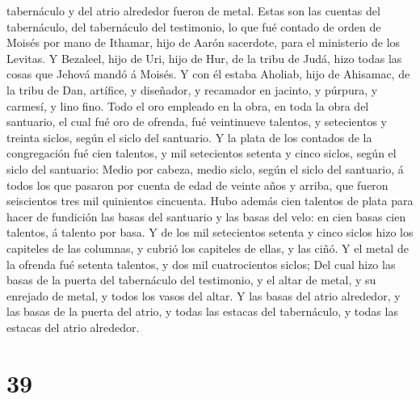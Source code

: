 tabernáculo y del atrio alrededor fueron de metal.  Estas
son las cuentas del tabernáculo, del tabernáculo del testimonio, lo que
fué contado de orden de Moisés por mano de Ithamar, hijo de Aarón
sacerdote, para el ministerio de los Levitas.  Y Bezaleel,
hijo de Uri, hijo de Hur, de la tribu de Judá, hizo todas las cosas que
Jehová mandó á Moisés.  Y con él estaba Aholiab, hijo de
Ahisamac, de la tribu de Dan, artífice, y diseñador, y recamador en
jacinto, y púrpura, y carmesí, y lino fino.  Todo el oro
empleado en la obra, en toda la obra del santuario, el cual fué oro de
ofrenda, fué veintinueve talentos, y setecientos y treinta siclos, según
el siclo del santuario.  Y la plata de los contados de la
congregación fué cien talentos, y mil setecientos setenta y cinco
siclos, según el siclo del santuario:  Medio por cabeza,
medio siclo, según el siclo del santuario, á todos los que pasaron por
cuenta de edad de veinte años y arriba, que fueron seiscientos tres mil
quinientos cincuenta.  Hubo además cien talentos de plata
para hacer de fundición las basas del santuario y las basas del velo: en
cien basas cien talentos, á talento por basa.  Y de los mil
setecientos setenta y cinco siclos hizo los capiteles de las columnas, y
cubrió los capiteles de ellas, y las ciñó.  Y el metal de
la ofrenda fué setenta talentos, y dos mil cuatrocientos siclos;
 Del cual hizo las basas de la puerta del tabernáculo del
testimonio, y el altar de metal, y su enrejado de metal, y todos los
vasos del altar.  Y las basas del atrio alrededor, y las
basas de la puerta del atrio, y todas las estacas del tabernáculo, y
todas las estacas del atrio alrededor.

\hypertarget{section-38}{%
\section{39}\label{section-38}}

